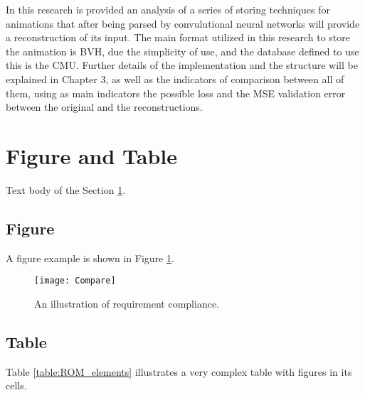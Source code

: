  In this research is provided an analysis of a series of storing techniques for animations that after being parsed by convulutional neural networks will provide a reconstruction
 of its input. The main format utilized in this research to store the animation is BVH, due the simplicity of use, and the database defined to use this is the CMU.
 Further details of the implementation and the structure will be explained in Chapter 3, as well as the indicators of comparison between all of them, using as main indicators
 the possible loss and the MSE validation error between the original and the reconstructions.
 
 \section{Figure and Table} \label{sec:FigureAndTable}

 Text body of the Section \ref{sec:FigureAndTable}.
 
 \subsection{Figure}  \label{subSec:Figure}

 A figure example is shown in Figure \ref{fig:Compare}.
 
 \begin{figure}
     \begin{center}
         \texttt{[image: Compare]}  %
        \end{center}
        \caption{An illustration of requirement compliance.}
        \label{fig:Compare}
    \end{figure}
    

\subsection{Table}  \label{subSec:Table}
    
 Table \ref{table:ROM_elements} illustrates a very complex table with figures in its cells.
 
